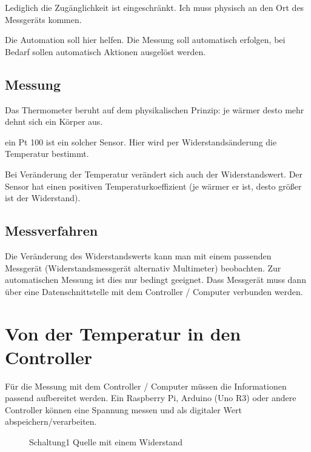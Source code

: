 \documentclass[paper = a4]{scrreprt}
\begin{document}
Lediglich die Zugänglichkeit ist eingeschränkt. Ich muss physisch an den Ort des Messgeräts kommen.

Die Automation soll hier helfen. Die Messung soll automatisch erfolgen, bei Bedarf sollen automatisch Aktionen ausgelöst werden.

\section{Messung}
Das Thermometer beruht auf dem physikalischen Prinzip: je wärmer desto mehr dehnt sich ein Körper aus.

ein Pt 100 ist ein solcher Sensor. Hier wird per Widerstandsänderung die Temperatur bestimmt.

Bei Veränderung der Temperatur verändert sich auch der Widerstandswert. Der Sensor hat einen positiven Temperaturkoeffizient (je wärmer er ist, desto größer ist der Widerstand).


\section{Messverfahren}
Die Veränderung des Widerstandswerts kann man mit einem passenden Messgerät (Widerstandsmessgerät alternativ Multimeter) beobachten. Zur automatischen Messung ist dies nur bedingt geeignet. Dass Messgerät muss dann über eine Datenschnittstelle mit dem Controller / Computer verbunden werden.

\chapter{Von der Temperatur in den Controller}
\label{sec:SensorAnController}
Für die Messung mit dem Controller / Computer müssen die Informationen passend aufbereitet werden. Ein Raspberry Pi, Arduino (Uno R3) oder andere Controller können eine Spannung messen und als digitaler Wert abspeichern/verarbeiten.

\begin{wrapfigure}{l}{0.5\textwidth}
 \centering
 
 \caption{Schaltung1 Quelle mit einem Widerstand}
 \label{abb:Schaltung1QuelleEinWiderstand}
\end{wrapfigure}
\end{document}
